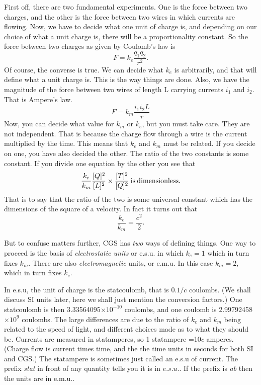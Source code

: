 First off, there are two fundamental experiments. One is the force between two
charges, and the other is the force between two wires in which currents are flowing. Now, we have to decide what one unit of charge is, and depending on our choice of what a unit charge is, there will be a proportionality constant. So
the force between two charges as given by Coulomb's law is
\begin{equation}
F=k_e \frac{q_1 q_2}{r^2}.
\end{equation}
Of course, the converse is true. We can decide what $k_e$ is arbitrarily, and that will define what a unit charge is. This is the way things are done.
Also, we have the magnitude of the  force between two wires of length L carrying currents $i_1$ and $i_2$. That is Ampere's law.
\begin{equation}
F=k_m \frac{ i_1 i_2 L}{r}
\end{equation}
Now, you can decide what value for $k_m$ or $k_e$, but you must take care. They are not independent. That is because the charge flow through a wire is the current multiplied by the time.  This means that $k_e$ and $k_m$ must be related. 
If you decide on one, you have also decided the other. The ratio of the two
constants is some constant.
If you divide one equation by the other you see that
\begin{equation}
  \frac{k_e}{k_m} \frac{ [Q]^2}{[L]^2} \times \frac{[T]^2}{[Q]^2} \> {\rm is \> dimensionless}.
\end{equation}
That is to say that the ratio of the two is some universal constant which has the dimensions of the square of a velocity. In fact it turns out that
\begin{equation}
\frac{k_e}{k_m}=\frac{c^2}{2}.
\end{equation}

But to confuse matters further, CGS has {\it two} ways of defining things.
 One way to proceed  is the basis of {\it electrostatic units} or e.s.u. in which $k_e=1$
 which in turn fixes $k_m$. There are also 
{\it electromagnetic} units, or e.m.u. In this case $k_m=2$, which in turn fixes
$ k_e$.

In e.s.u, the unit of charge is the statcoulomb, that is $0.1/c$ coulombs.
(We shall discuss SI units later, here we shall just mention the conversion factors.) One statcoulomb is then 3.33564095$\times 10^{-10}$  coulombs, and one coulomb is
2.99792458$ \times 10^9$ coulombs. The large differences are due to the ratio 
of $k_e$ and $k_m$ being related to the speed of light, and different choices
made as to what they should be. Currents are measured in statamperes, so
1 statampere =10$c$ amperes. (Charge flow is current times time, and the
the time units in seconds for both SI and CGS.) The statampere is sometimes 
just called an e.s.u of current. The prefix {\it stat} in front of any quantity tells you it is
in $e.s.u.$. If the prefix is {\it ab} then the units are in e.m.u..


